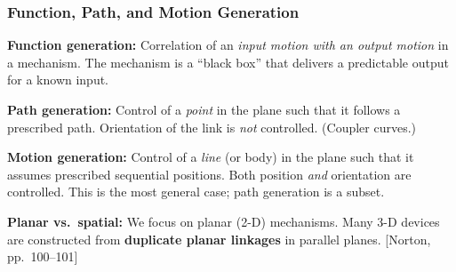 \documentclass[10pt,aspectratio=43]{beamer}
\newcommand{\pref}[1]{\vfill\hfill{\scriptsize\color{gray}[Norton, pp.~#1]}}
\begin{document}

\begin{frame}
\frametitle{Function, Path, and Motion Generation}

\begin{yellowbox}
\textbf{Function generation:} Correlation of an \emph{input motion with an output motion} in a mechanism. The mechanism is a ``black box'' that delivers a predictable output for a known input.
\end{yellowbox}

\vspace{4pt}
\begin{yellowbox}
\textbf{Path generation:} Control of a \emph{point} in the plane such that it follows a prescribed path. Orientation of the link is \emph{not} controlled. (Coupler curves.)
\end{yellowbox}

\vspace{4pt}
\begin{yellowbox}
\textbf{Motion generation:} Control of a \emph{line} (or body) in the plane such that it assumes prescribed sequential positions. Both position \emph{and} orientation are controlled. This is the most general case; path generation is a subset.
\end{yellowbox}

\vspace{4pt}
\textbf{Planar vs.\ spatial:} We focus on planar (2-D) mechanisms. Many 3-D devices are constructed from \textbf{duplicate planar linkages} in parallel planes.
\pref{100--101}
\end{frame}

\end{document}

